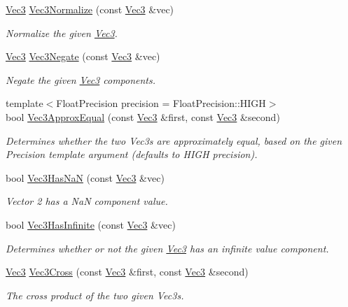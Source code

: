 \begin{DoxyCompactItemize}
\hyperlink{classgofxmath_1_1_vec3}{Vec3} \hyperlink{classgofxmath_1_1_vec3_afdbff8ff3fad75f9a9e924a58fcc4f4a}{Vec3\+Normalize} (const \hyperlink{classgofxmath_1_1_vec3}{Vec3} \&vec)
\begin{DoxyCompactList}\small\item\em Normalize the given \hyperlink{classgofxmath_1_1_vec3}{Vec3}. \end{DoxyCompactList}\item 
\hyperlink{classgofxmath_1_1_vec3}{Vec3} \hyperlink{classgofxmath_1_1_vec3_a8ccc52146f984a79c566ee8348e410e2}{Vec3\+Negate} (const \hyperlink{classgofxmath_1_1_vec3}{Vec3} \&vec)
\begin{DoxyCompactList}\small\item\em Negate the given \hyperlink{classgofxmath_1_1_vec3}{Vec3} components. \end{DoxyCompactList}\item 
{\footnotesize template$<$Float\+Precision precision = Float\+Precision\+::\+H\+I\+G\+H$>$ }\\bool \hyperlink{classgofxmath_1_1_vec3_ac042c4407bfaa66715e3c4b5b0a839f4}{Vec3\+Approx\+Equal} (const \hyperlink{classgofxmath_1_1_vec3}{Vec3} \&first, const \hyperlink{classgofxmath_1_1_vec3}{Vec3} \&second)
\begin{DoxyCompactList}\small\item\em Determines whether the two Vec3s are approximately equal, based on the given Precision template argument (defaults to H\+I\+G\+H precision). \end{DoxyCompactList}\item 
bool \hyperlink{classgofxmath_1_1_vec3_a5d19e3d1ee15741a65ede16f20e919a4}{Vec3\+Has\+Na\+N} (const \hyperlink{classgofxmath_1_1_vec3}{Vec3} \&vec)
\begin{DoxyCompactList}\small\item\em Vector 2 has a Na\+N component value. \end{DoxyCompactList}\item 
bool \hyperlink{classgofxmath_1_1_vec3_ae5205e805b23de865db9a40e5936f82a}{Vec3\+Has\+Infinite} (const \hyperlink{classgofxmath_1_1_vec3}{Vec3} \&vec)
\begin{DoxyCompactList}\small\item\em Determines whether or not the given \hyperlink{classgofxmath_1_1_vec3}{Vec3} has an infinite value component. \end{DoxyCompactList}\item 
\hyperlink{classgofxmath_1_1_vec3}{Vec3} \hyperlink{classgofxmath_1_1_vec3_a455b2ef17c947a780f2b2b9e4b6cccc8}{Vec3\+Cross} (const \hyperlink{classgofxmath_1_1_vec3}{Vec3} \&first, const \hyperlink{classgofxmath_1_1_vec3}{Vec3} \&second)
\begin{DoxyCompactList}\small\item\em The cross product of the two given Vec3s. \end{DoxyCompactList}\end{DoxyCompactItemize}



